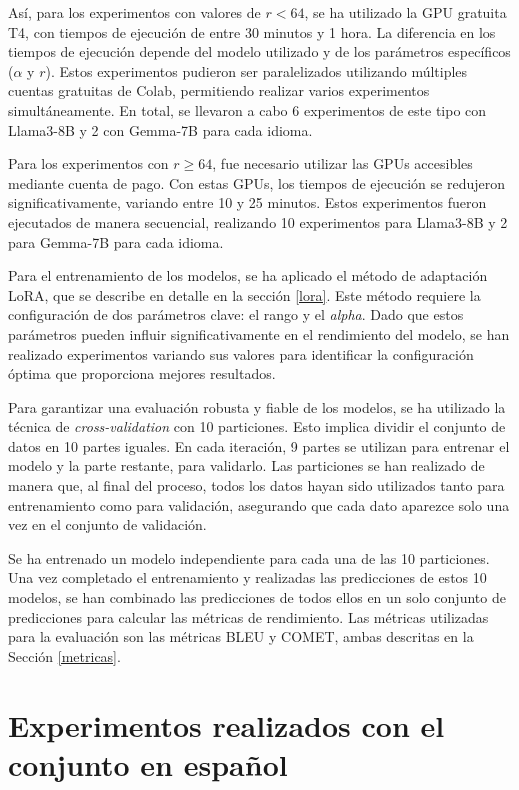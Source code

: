 \documentclass[11pt,spanish,listoffigures,listoftables]{tfgetsinf}
\begin{document}
Así, para los experimentos con valores de $r < 64$, se ha utilizado la GPU gratuita T4, con tiempos de ejecución de entre 30 minutos y 1 hora. La diferencia en los tiempos de ejecución depende del modelo utilizado y de los parámetros específicos ($\alpha$ y $r$). Estos experimentos pudieron ser paralelizados utilizando múltiples cuentas gratuitas de Colab, permitiendo realizar varios experimentos simultáneamente. En total, se llevaron a cabo 6 experimentos de este tipo con Llama3-8B y 2 con Gemma-7B para cada idioma.

Para los experimentos con $r \ge 64$, fue necesario utilizar las GPUs accesibles mediante cuenta de pago. Con estas GPUs, los tiempos de ejecución se redujeron significativamente, variando entre 10 y 25 minutos. Estos experimentos fueron ejecutados de manera secuencial, realizando 10 experimentos para Llama3-8B y 2 para Gemma-7B para cada idioma.

Para el entrenamiento de los modelos, se ha  aplicado el método de adaptación LoRA, que se describe en detalle en la sección \ref{lora}. Este método requiere la configuración de dos parámetros clave: el rango y el \textit{alpha}. Dado que estos parámetros pueden influir significativamente en el rendimiento del modelo, se han realizado experimentos variando sus valores para identificar la configuración óptima que proporciona mejores resultados.

Para garantizar una evaluación robusta y fiable de los modelos, se ha utilizado la técnica de \textit{cross-validation} con 10 particiones. Esto implica dividir el conjunto de datos en 10 partes iguales. En cada iteración, 9 partes se utilizan para entrenar el modelo y la parte restante, para validarlo. Las particiones se han realizado de manera que, al final del proceso, todos los datos hayan sido utilizados tanto para entrenamiento como para validación, asegurando que cada dato aparezce solo una vez en el conjunto de validación.

Se ha entrenado un modelo independiente para cada una de las 10 particiones. Una vez completado el entrenamiento y realizadas las predicciones de estos 10 modelos, se han combinado las predicciones de todos ellos en un solo conjunto de predicciones para calcular las métricas de rendimiento. Las métricas utilizadas para la evaluación son las métricas BLEU y COMET, ambas descritas en la Sección \ref{metricas}.

\section{Experimentos realizados con el conjunto en español}
\end{document}

